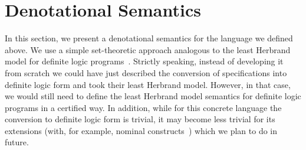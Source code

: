 \begin{comment}
\begin{figure}[t]
\[
\begin{array}{rcl}
  x\,[t/x] &=& t \\
  y\,[t/x] &=& y,\;\; y\ne x\\
  C_i^{k_i}\,(t_1,\dots,t_{k_i})\,[t/x]&=&C_i^{k_i}\,(t_1\,[t/x],\dots,t_{k_i}\,[t/x])\\
  (t_1 \equiv t_2)\,[t/x]&=&t_1\,[t/x] \equiv t_2\,[t/x]\\
  (g_1 \wedge g_2)\,[t/x]&=&g_1\,[t/x] \wedge g_2\,[t/x]\\
  (g_1 \vee g_2)\,[t/x]&=&g_1\,[t/x] \vee g_2\,[t/x]\\
  (\mbox{\lstinline|fresh|}\;x\,.\,g)\,[t/x]&=&\mbox{\lstinline|fresh|}\;x\,.\,g\\
  (\mbox{\lstinline|fresh|}\;y\,.\,g)\,[t/x]&=&\mbox{\lstinline|fresh|}\;y\,.\,(g\,[t/x]),\;\;y\ne x\\
  (R_i^{k_i}\,(t_1,\dots,t_{k_i})\,[t/x]&=&R_i^{k_i}\,(t_1\,[t/x],\dots,t_{k_i}\,[t/x])
\end{array}
\]
  \caption{Substitutions for terms and goals}
  \label{substitution}
\end{figure}
\end{comment}

\section{Denotational Semantics}
\label{denotational}

In this section, we present a denotational semantics for the language we defined above. We use a simple set-theoretic
approach analogous to the least Herbrand model for definite logic programs~\cite{LHM}.
Strictly speaking, instead of developing it from scratch we could have just described the conversion of specifications
into definite logic form and took their least Herbrand model. However, in that case, we would still need to define
the least Herbrand model semantics for definite logic programs in a certified way. In addition, while for
this concrete language the conversion to definite logic form is trivial, it may become less trivial for
its extensions (with, for example, nominal constructs~\cite{AlphaKanren}) which we plan to do in future.

